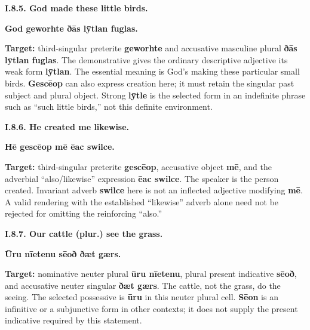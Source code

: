 \par\begin{minipage}{\linewidth}\raggedright
\textbf{I.8.5. God made these little birds.}

\textbf{God geworhte ðās lȳtlan fuglas.}

\textbf{Target:} third-singular preterite \textbf{geworhte} and accusative masculine plural \textbf{ðās lȳtlan fuglas}. The demonstrative gives the ordinary descriptive adjective its weak form \textbf{lȳtlan}. The essential meaning is God's making these particular small birds. \textbf{Gescēop} can also express creation here; it must retain the singular past subject and plural object. Strong \textbf{lȳtle} is the selected form in an indefinite phrase such as “such little birds,” not this definite environment.

\end{minipage}\par\addvspace{4pt}

\par\begin{minipage}{\linewidth}\raggedright
\textbf{I.8.6. He created me likewise.}

\textbf{Hē gescēop mē ēac swilce.}

\textbf{Target:} third-singular preterite \textbf{gescēop}, accusative object \textbf{mē}, and the adverbial “also/\allowbreak{}likewise” expression \textbf{ēac swilce}. The speaker is the person created. Invariant adverb \textbf{swilce} here is not an inflected adjective modifying \textbf{mē}. A valid rendering with the established “likewise” adverb alone need not be rejected for omitting the reinforcing “also.”

\end{minipage}\par\addvspace{4pt}

\par\begin{minipage}{\linewidth}\raggedright
\textbf{I.8.7. Our cattle (plur.) see the grass.}

\textbf{Ūru nīetenu sēoð ðæt gærs.}

\textbf{Target:} nominative neuter plural \textbf{ūru nīetenu}, plural present indicative \textbf{sēoð}, and accusative neuter singular \textbf{ðæt gærs}. The cattle, not the grass, do the seeing. The selected possessive is \textbf{ūru} in this neuter plural cell. \textbf{Sēon} is an infinitive or a subjunctive form in other contexts; it does not supply the present indicative required by this statement.

\end{minipage}\par\addvspace{4pt}

